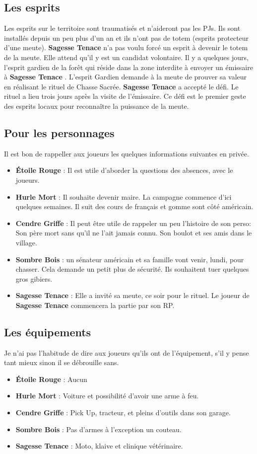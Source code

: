 \documentclass[oneside,12pt]{book}
\newcommand{\Lynn}{\textbf{Étoile Rouge} }
\newcommand{\Jessica}{\textbf{Sagesse Tenace} }
\newcommand{\Luke}{\textbf{Cendre Griffe} }
\newcommand{\Peter}{\textbf{Hurle Mort} }
\newcommand{\Leonard}{\textbf{Sombre Bois} }
\begin{document}
\begin{flushleft}
\clearpage

\subsection{Les esprits}
Les esprits sur le territoire sont traumatisés et n'aideront pas les PJs. Ils sont installés depuis un peu plus d'un an et ils n'ont pas de totem (esprits protecteur d'une meute). 
\Jessica n'a pas voulu forcé un esprit à devenir le totem de la meute. Elle attend qu'il y est un candidat volontaire. 
Il y a quelques jours, l'esprit gardien de la forêt qui réside dans la zone interdite à envoyer un émissaire à \Jessica. 
L'esprit Gardien demande à la meute de prouver sa valeur en réalisant le rituel de Chasse Sacrée. 
\Jessica a accepté le défi. Le rituel a lieu trois jours après la visite de l'émissaire. Ce défi est le premier geste des esprits locaux pour reconnaître la puissance de la meute.

\subsection{Pour les personnages}
Il est bon de rappeller aux joueurs les quelques informations suivantes en privée.
\begin{itemize}
\item \Lynn : Il est utile d'aborder la questions des absences, avec le joueurs. 
\item \Peter : Il souhaite devenir maire. La campagne commence d'ici quelques semaines. Il suit des cours de français et gomme sont côté américain.
\item \Luke : Il peut être utile de rappeler un peu l'histoire de son perso: Son père mort sans qu'il ne l'ait jamais connu. Son boulot et ses amis dans le village. 
\item \Leonard : un sénateur américain et sa famille vont venir, lundi, pour chasser. Cela demande un petit plus de sécurité. Ils souhaitent tuer quelques gros gibiers. 
\item \Jessica : Elle a invité sa meute, ce soir pour le rituel. Le joueur de \Jessica commencera la partie par son RP. 
\end{itemize}

\subsection{Les équipements}
Je n'ai pas l'habitude de dire aux joueurs qu'ils ont de l'équipement, s'il y pense tant mieux sinon il se débrouille sans.
\begin{itemize}
\item \Lynn : Aucun
\item \Peter : Voiture et possibilité d'avoir une arme à feu.
\item \Luke : Pick Up, tracteur, et pleins d'outils dans son garage.
\item \Leonard : Pas d'armes à l'exception un couteau.
\item \Jessica : Moto, klaive et clinique vétérinaire. 
\end{itemize}


\end{flushleft}
\end{document}
